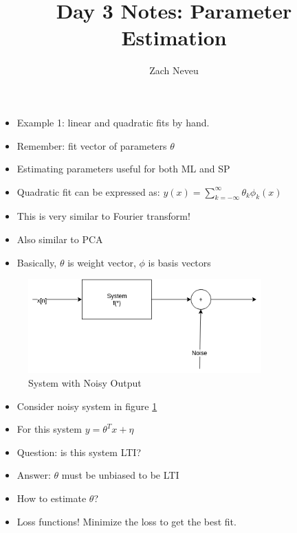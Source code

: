 \documentclass[12pt, letter]{article}
\author{Zach Neveu}
\title{ Day 3 Notes: Parameter Estimation }
\begin{document}
\maketitle
\begin{itemize}
	\item Example 1: linear and quadratic fits by hand. 
	\item Remember: fit vector of parameters $\theta$
	\item Estimating parameters useful for both ML and SP
    \item Quadratic fit can be expressed as: $y(x) = \sum_{k=-\infty}^{\infty} \theta_k\phi_k(x)$
	\item This is very similar to Fourier transform!
	\item Also similar to PCA
	\item Basically, $\theta$ is weight vector, $\phi$ is basis vectors
\end{itemize}

\begin{figure}[h]
	\centering
	\includegraphics[width=0.8\textwidth]{noisy-system}
	\caption{System with Noisy Output}
	\label{fig:noisy-system}
\end{figure}

\begin{itemize}
	\item Consider noisy system in figure \ref{fig:noisy-system}
	\item For this system $y=\theta^Tx+\eta$ 
	\item Question: is this system LTI?
	\item Answer: $\theta$ must be unbiased to be LTI
   \item How to estimate $\theta$?
	\item Loss functions! Minimize the loss to get the best fit.
\end{itemize}
\end{document}
